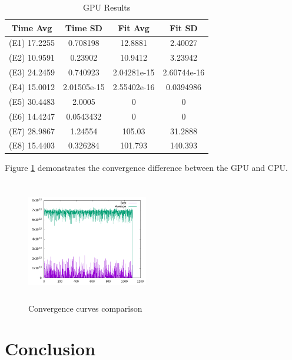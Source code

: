 \documentclass[conference]{IEEEtran}
\begin{document}
\begin{table}[H]
    \renewcommand{\arraystretch}{1.3}
    \caption{GPU Results}
    \label{results-gpu}
    \centering
    \begin{tabular}{c|c|c|c}
    \hline
        Time Avg & Time SD & Fit Avg & Fit SD\\
    \hline
        (E1) 17.2255  & 0.708198 &  12.8881 & 2.40027 \\
        (E2) 10.9591  & 0.23902 & 10.9412 & 3.23942 \\
        (E3) 24.2459  & 0.740923  & 2.04281e-15 & 2.60744e-16 \\
        (E4) 15.0012 & 2.01505e-15 & 2.55402e-16 & 0.0394986 \\
        (E5) 30.4483  & 2.0005    & 0 & 0 \\
        (E6) 14.4247 & 0.0543432 & 0 & 0 \\
        (E7) 28.9867 & 1.24554 & 105.03 & 31.2888 \\
        (E8) 15.4403 & 0.326284 & 101.793 & 140.393 \\
    \end{tabular}
\end{table}

Figure \ref{convergence_comparisom} demonstrates the convergence difference between
the GPU and CPU.

\begin{figure}[H]
    \begin{center}
    \includegraphics[width=200px,height=200px]{objective}
    \end{center}
    \label{convergence_comparisom}
    \caption{Convergence curves comparison}
\end{figure}


\section{Conclusion} %
\end{document}
